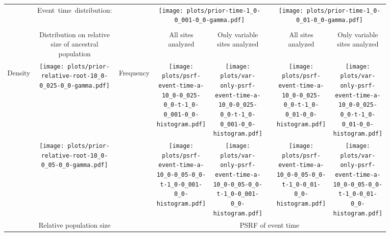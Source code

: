 \documentclass[border=10pt,varwidth=30cm]{standalone}
\begin{document}
\begin{figure}
    \centering
    \begin{tabular}{@{}cccccccc@{}}
        & \multirow{1}{0.15\textwidth}[8em]{\centering\Large Event~time~distribution:}
        &
        & \multicolumn{2}{c}{\texttt{[image: plots/prior-time-1\_0-0\_001-0\_0-gamma.pdf]}}
        &
        & \multicolumn{2}{c}{\texttt{[image: plots/prior-time-1\_0-0\_01-0\_0-gamma.pdf]}} \\
        \cline{1-2}\cline{4-5}\cline{7-8}
        & & & & & & & \\
        & \multirow{1}{0.15\textwidth}{\centering\Large Distribution on relative size of ancestral population}
        &
        & \multirow{1}{0.15\textwidth}{\centering\Large All sites analyzed}
        & \multirow{1}{0.15\textwidth}{\centering\Large Only variable sites analyzed}
        &
        & \multirow{1}{0.15\textwidth}{\centering\Large All sites analyzed}
        & \multirow{1}{0.15\textwidth}{\centering\Large Only variable sites analyzed} \\[9ex]
        \multirow{2}{*}[1em]{\begin{sideways}\large Density\end{sideways}}
        & \texttt{[image: plots/prior-relative-root-10\_0-0\_025-0\_0-gamma.pdf]}
        & \multirow{2}{*}[2em]{\begin{sideways}\large Frequency\end{sideways}}
        & \texttt{[image: plots/psrf-event-time-a-10\_0-0\_025-0\_0-t-1\_0-0\_001-0\_0-histogram.pdf]}
        & \texttt{[image: plots/var-only-psrf-event-time-a-10\_0-0\_025-0\_0-t-1\_0-0\_001-0\_0-histogram.pdf]}
        &
        & \texttt{[image: plots/psrf-event-time-a-10\_0-0\_025-0\_0-t-1\_0-0\_01-0\_0-histogram.pdf]}
        & \texttt{[image: plots/var-only-psrf-event-time-a-10\_0-0\_025-0\_0-t-1\_0-0\_01-0\_0-histogram.pdf]} \\
        & \texttt{[image: plots/prior-relative-root-10\_0-0\_05-0\_0-gamma.pdf]}
        &
        & \texttt{[image: plots/psrf-event-time-a-10\_0-0\_05-0\_0-t-1\_0-0\_001-0\_0-histogram.pdf]}
        & \texttt{[image: plots/var-only-psrf-event-time-a-10\_0-0\_05-0\_0-t-1\_0-0\_001-0\_0-histogram.pdf]}
        &
        & \texttt{[image: plots/psrf-event-time-a-10\_0-0\_05-0\_0-t-1\_0-0\_01-0\_0-histogram.pdf]}
        & \texttt{[image: plots/var-only-psrf-event-time-a-10\_0-0\_05-0\_0-t-1\_0-0\_01-0\_0-histogram.pdf]} \\
        & \multirow{1}{0.15\textwidth}{\centering\large Relative population size}
        &
        & \multicolumn{5}{c}{\large PSRF of event time} \\
    \end{tabular}
\end{figure}
\end{document}
